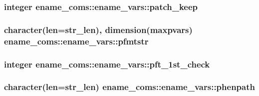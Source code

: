 \subsubsection[{patch\+\_\+keep}]{\setlength{\rightskip}{0pt plus 5cm}integer ename\+\_\+coms\+::ename\+\_\+vars\+::patch\+\_\+keep}\label{structename__coms_1_1ename__vars_a294ad8776f6d095b807d079865c0a54d}
\hypertarget{structename__coms_1_1ename__vars_a0f7fb2fd0bc22fff6bc3144268c8ea04}{}
\subsubsection[{pfmtstr}]{\setlength{\rightskip}{0pt plus 5cm}character(len=str\+\_\+len), dimension(maxpvars) ename\+\_\+coms\+::ename\+\_\+vars\+::pfmtstr}\label{structename__coms_1_1ename__vars_a0f7fb2fd0bc22fff6bc3144268c8ea04}
\hypertarget{structename__coms_1_1ename__vars_abfe25a7b4b698d0f161a9d63003a531d}{}
\subsubsection[{pft\+\_\+1st\+\_\+check}]{\setlength{\rightskip}{0pt plus 5cm}integer ename\+\_\+coms\+::ename\+\_\+vars\+::pft\+\_\+1st\+\_\+check}\label{structename__coms_1_1ename__vars_abfe25a7b4b698d0f161a9d63003a531d}
\hypertarget{structename__coms_1_1ename__vars_a3cd7a9b820dac3238181ea9791a817c7}{}
\subsubsection[{phenpath}]{\setlength{\rightskip}{0pt plus 5cm}character(len=str\+\_\+len) ename\+\_\+coms\+::ename\+\_\+vars\+::phenpath}\label{structename__coms_1_1ename__vars_a3cd7a9b820dac3238181ea9791a817c7}
\hypertarget{structename__coms_1_1ename__vars_a466aacc58395db708dab81248d637b31}{}
